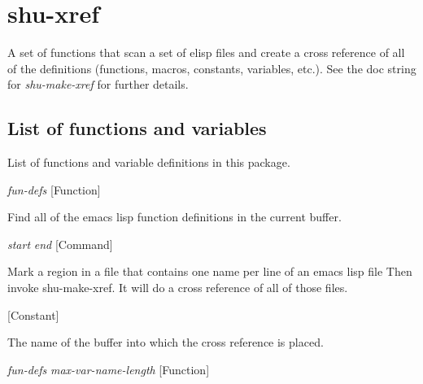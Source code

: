 \section{shu-xref}



A set of functions that scan a set of elisp files and create a cross reference
of all of the definitions (functions, macros, constants, variables, etc.).
See the doc string for \emph{shu-make-xref} for further details.


\subsection{List of functions and variables}

List of functions and variable definitions in this package.



\vspace{1em}
\noindent
{}
\usebox{\funcname}\emph{fun-defs}
 \hfill [Function]

\begin{doc-string}
Find all of the emacs lisp function definitions in the current buffer.
\end{doc-string}

\vspace{1em}
\noindent
{}
\usebox{\funcname}\emph{start} \emph{end}
 \hfill [Command]

\begin{doc-string}
Mark a region in a file that contains one name per line of an emacs lisp file
Then invoke shu-make-xref.  It will do a cross reference of all of those files.
\end{doc-string}

\vspace{1em}
\noindent
{}
\usebox{\funcname}
 \hfill [Constant]

\begin{doc-string}
The name of the buffer into which the cross reference is placed.
\end{doc-string}

\vspace{1em}
\noindent
{}
\usebox{\funcname}\emph{fun-defs} \emph{max-var-name-length}
 \hfill [Function]
\hspace*{\wd\funcname}

